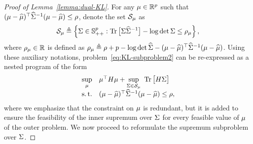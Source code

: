 \documentclass{article}
\begin{document}
\begin{proof}[Proof of Lemma~\ref{lemma:dual-KL}]
    For any $\mu \in \mathbb{R}^p$ such that $(\mu - \widehat {\mu})^\top \widehat{\Sigma}^{-1} (\mu - \widehat {\mu}) \le \rho$, denote the set $\mathcal S_\mu$ as
	\[
	\mathcal S_\mu \triangleq \left\{
	\Sigma \in \mathbb{S}_{++}^p : \operatorname{Tr} \big[ \Sigma \widehat{\Sigma}^{-1} \big] - \log\det \Sigma\leq \rho_\mu
	\right\},
	\]
	where $\rho_\mu \in \mathbb{R}$ is defined as $\rho_{\mu} \triangleq \rho + p - \log\det\widehat{\Sigma} - (\mu - \widehat {\mu})^\top \widehat{\Sigma}^{-1}(\mu - \widehat {\mu})$. Using these auxiliary notations, problem~\eqref{eq:KL-subproblem2} can be re-expressed as a nested program of the form
	\[
	\begin{array}{cl}
	\sup\limits_{\mu} & \mu^\top H \mu + \sup\limits_{\Sigma \in \mathcal S_\mu} ~ \operatorname{Tr} \big[ H \Sigma \big] \\
	\operatorname{s.t.} & (\mu - \widehat {\mu})^\top \widehat{\Sigma}^{-1} (\mu - \widehat {\mu}) \leq \rho,
	\end{array}
	\]
	where we emphasize that the constraint on $\mu$ is redundant, but it is added to ensure the feasibility of the inner supremum over $\Sigma$ for every feasible value of $\mu$ of the outer problem. We now proceed to reformulate the supremum subproblem over $\Sigma$.
	

\end{proof}
\end{document}
